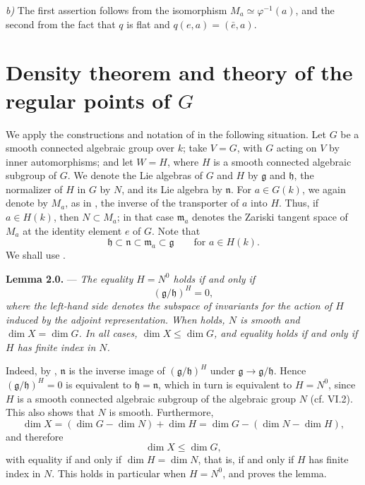 \textit{b)} The first assertion follows from the isomorphism
\(M_a\simeq\varphi^{-1}(a)\), and the second from the fact that \(q\)
is flat and \(q(e,a)=(\bar e,a)\).

\section{Density theorem and theory of the regular points of \(G\)}

We apply the constructions and notation of  in
the following situation. Let \(G\) be a smooth connected algebraic
group over \(k\); take \(V=G\), with \(G\) acting on \(V\) by inner
automorphisms; and let \(W=H\), where \(H\) is a smooth connected
algebraic subgroup of \(G\). We denote the Lie algebras of \(G\) and
\(H\) by \(\mathfrak g\) and \(\mathfrak h\), the normalizer of \(H\)
in \(G\) by \(N\), and its Lie algebra by \(\mathfrak n\). For
\(a\in G(k)\), we again denote by \(M_a\), as in , the
inverse of the transporter of \(a\) into \(H\). Thus, if
\(a\in H(k)\), then \(N\subset M_a\); in that case
\(\mathfrak m_a\) denotes the Zariski tangent space of \(M_a\) at the
identity element \(e\) of \(G\). Note that
\[
  \mathfrak h\subset\mathfrak n\subset\mathfrak m_a
  \subset\mathfrak g
  \qquad\text{for }a\in H(k).
\]
We shall use .

\medskip
\noindent{}\textbf{Lemma 2.0.} ---
\textit{The equality \(H=N^0\) holds if and only if}
\[
  (\mathfrak g/\mathfrak h)^H=0,
\]
\textit{where the left-hand side denotes the subspace of invariants
for the action of \(H\) induced by the adjoint representation. When
 holds, \(N\) is smooth and \(\dim X=\dim G\). In all
cases, \(\dim X\leq\dim G\), and equality holds if and only if \(H\)
has finite index in \(N\).}

Indeed, by , \(\mathfrak n\) is the inverse image of
\((\mathfrak g/\mathfrak h)^H\) under
\(\mathfrak g\to\mathfrak g/\mathfrak h\). Hence
\((\mathfrak g/\mathfrak h)^H=0\) is equivalent to
\(\mathfrak h=\mathfrak n\), which in turn is equivalent to
\(H=N^0\), since \(H\) is a smooth connected algebraic subgroup of
the algebraic group \(N\) (cf. VI.2). This also shows that \(N\) is
smooth. Furthermore,
\[
  \dim X=(\dim G-\dim N)+\dim H
        =\dim G-(\dim N-\dim H),
\]
and therefore
\[
  \dim X\leq\dim G,
\]
with equality if and only if \(\dim H=\dim N\), that is, if and only
if \(H\) has finite index in \(N\). This holds in particular when
\(H=N^0\), and proves the lemma.

